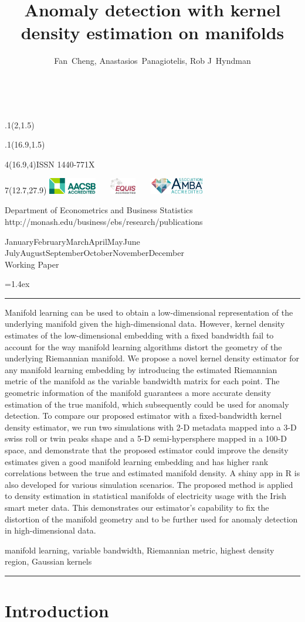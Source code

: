 \documentclass[11pt,a4paper,]{article}
\title{Anomaly detection with kernel density estimation on manifolds}
\author{Fan~Cheng, Anastasios~Panagiotelis, Rob J~Hyndman}
\date{\sf\Date~\Month~\Year}
\makeatletter
\def\Date{\number\day}
\def\Month{\ifcase\month\or
 January\or February\or March\or April\or May\or June\or
 July\or August\or September\or October\or November\or December\fi}
\def\Year{\number\year}
\def\showjel{{\large\textsf{\textbf{JEL classification:}}~\@jel}}
\def\cover{{\sffamily\setcounter{page}{0}
        \thispagestyle{empty}
        \placefig{2}{1.5}{width=5cm}{monash2}
        \placefig{16.9}{1.5}{width=2.1cm}{MBusSchool}
        \begin{textblock}{4}(16.9,4)ISSN 1440-771X\end{textblock}
        \begin{textblock}{7}(12.7,27.9)\hfill
        \includegraphics[height=0.7cm]{AACSB}~~~
        \includegraphics[height=0.7cm]{EQUIS}~~~
        \includegraphics[height=0.7cm]{AMBA}
        \end{textblock}
        \vspace*{2cm}
        \begin{center}\Large
        Department of Econometrics and Business Statistics\\[.5cm]
        \footnotesize http://monash.edu/business/ebs/research/publications
        \end{center}\vspace{2cm}
        \begin{center}
        \fbox{\parbox{14cm}{\begin{onehalfspace}\centering\Huge\vspace*{0.3cm}
                \textsf{\textbf{\expandafter{\@title}}}\vspace{1cm}\par
                \LARGE\@author\end{onehalfspace}
        }}
        \end{center}
        \vfill
                \begin{center}\Large
                \Month~\Year\\[1cm]
                Working Paper \@wp
        \end{center}\vspace*{2cm}}}
\def\pageone{{\sffamily\setstretch{1}%
        \thispagestyle{empty}%
        \vbox to \textheight{%
        \raggedright\baselineskip=1.2cm
     {\fontsize{24.88}{30}\sffamily\textbf{\expandafter{\@title}}}
        \vspace{2cm}\par
        \hspace{1cm}\parbox{14cm}{\sffamily\large\@addresses}\vspace{1cm}\vfill
        \hspace{1cm}{\large\Date~\Month~\Year}\\[1cm]
        \hspace{1cm}\showjel\vss}}}
\def\blindtitle{{\sffamily
     \thispagestyle{plain}\raggedright\baselineskip=1.2cm
     {\fontsize{24.88}{30}\sffamily\textbf{\expandafter{\@title}}}\vspace{1cm}\par
        }}
\def\titlepage{{\cover\newpage\pageone\newpage\blindtitle}}
\let\maketitle\titlepage
\newenvironment{keywords}{\par\vspace{0.5cm}\noindent{\sffamily\textbf{Keywords:}}}{\vspace{0.25cm}\par\hrule\vspace{0.5cm}\par}
\renewenvironment{abstract}{\begin{minipage}{\textwidth}\parskip=1.4ex\noindent
\hrule\vspace{0.1cm}\par{\sffamily\textbf{\abstractname}}\newline}
  {\end{minipage}}
\def\placefig#1#2#3#4{\begin{textblock}{.1}(#1,#2)\rlap{\texttt{[image: \#4]}}\end{textblock}}
\makeatother
\begin{document}
\maketitle
\begin{abstract}
Manifold learning can be used to obtain a low-dimensional representation of the underlying manifold given the high-dimensional data. However, kernel density estimates of the low-dimensional embedding with a fixed bandwidth fail to account for the way manifold learning algorithms distort the geometry of the underlying Riemannian manifold. We propose a novel kernel density estimator for any manifold learning embedding by introducing the estimated Riemannian metric of the manifold as the variable bandwidth matrix for each point. The geometric information of the manifold guarantees a more accurate density estimation of the true manifold, which subsequently could be used for anomaly detection. To compare our proposed estimator with a fixed-bandwidth kernel density estimator, we run two simulations with 2-D metadata mapped into a 3-D swiss roll or twin peaks shape and a 5-D semi-hypersphere mapped in a 100-D space, and demonstrate that the proposed estimator could improve the density estimates given a good manifold learning embedding and has higher rank correlations between the true and estimated manifold density. A shiny app in R is also developed for various simulation scenarios. The proposed method is applied to density estimation in statistical manifolds of electricity usage with the Irish smart meter data. This demonstrates our estimator's capability to fix the distortion of the manifold geometry and to be further used for anomaly detection in high-dimensional data.
\end{abstract}
\begin{keywords}
manifold learning, variable bandwidth, Riemannian metric, highest density region, Gaussian kernels
\end{keywords}

\newpage

\hypertarget{introduction}{%
\section{Introduction}\label{introduction}}
\end{document}
